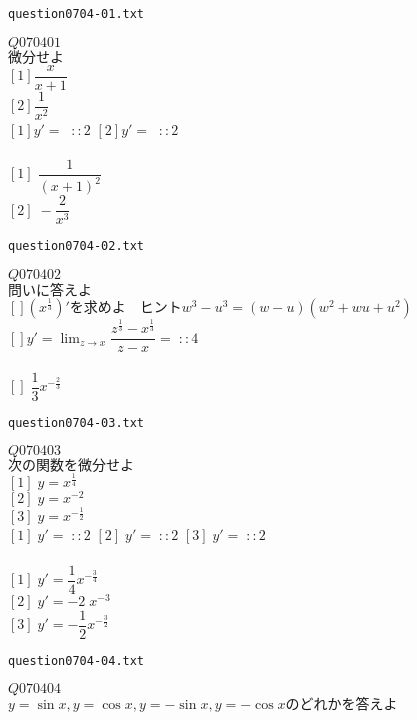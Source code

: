 \documentclass[10pt,dvipdfmx]{jarticle}
\begin{document}
\begin{center}
\verb|question0704-01.txt|\\
\end{center}
$Q070401$\\
$\text{微分せよ}$\\
$[1]\dfrac{x}{x+1}$\\
$[2]\dfrac{1}{x^2}$\\
$[1]y'=\;\;::2$ 
$[2]y'=\;\;::2$ 
\\
\\
$[1]\;\dfrac{1}{(x+1)^2}$\\
$[2]\;-\dfrac{2}{x^3}$\\
\newpage
\begin{center}
\verb|question0704-02.txt|\\
\end{center}
$Q070402$\\
$\text{問いに答えよ}$\\
$[](x^{\frac{1}{3}})'\text{を求めよ　ヒント}w^3-u^3=(w-u)(w^2+wu+u^2)$\\
$[]y'=\displaystyle\lim_{z \to x} \dfrac{z^{\frac{1}{3}}-x^{\frac{1}{3}}}{z-x}=\;::4$ 
\\
\\
$[]\;\dfrac{1}{3}x^{-\frac{2}{3}}$\\
\newpage
\begin{center}
\verb|question0704-03.txt|\\
\end{center}
$Q070403$\\
$\text{次の関数を微分せよ}$\\
$[1]\;y=x^{\frac{1}{4}}$\\
$[2]\;y=x^{-2}$\\
$[3]\;y=x^{-\frac{1}{2}}$\\
$[1]\;y'=\;::2$ 
$[2]\;y'=\;::2$ 
$[3]\;y'=\;::2$ 
\\
\\
$[1]\;y'=\dfrac{1}{4}x^{-\frac{3}{4}}$\\
$[2]\;y'=-2\;x^{-3}$\\
$[3]\;y'=-\dfrac{1}{2}x^{-\frac{3}{2}}$\\
\newpage
\begin{center}
\verb|question0704-04.txt|\\
\end{center}
$Q070404$\\
$y=\sin x ,y=\cos x ,y=-\sin x ,y=-\cos x \text{のどれかを答えよ}$\\
\end{document}
